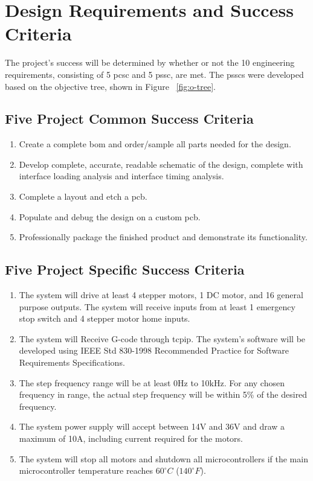 \chapter{Design Requirements and Success Criteria}
The project's success will be determined by whether or not the 10 engineering requirements, consisting of 5 \gls{pcsc} and 5 \gls{pssc}, are met.
The \gls{pssc}s were developed based on the objective tree, shown in Figure ~\ref{fig:o-tree}.

\section{Five Project Common Success Criteria}
\begin{enumerate}
	\item Create a complete \gls{bom} and order/sample all parts needed for the design.
	\item Develop complete, accurate, readable schematic of the design, complete with interface loading analysis and interface timing analysis. 
	\item Complete a layout and etch a \gls{pcb}.
	\item Populate and debug the design on a custom \gls{pcb}.
	\item Professionally package the finished product and demonstrate its functionality.
\end{enumerate}

\section{Five Project Specific Success Criteria}
\label{sec:psscs}
\begin{enumerate}
	\item The system will drive at least 4 stepper motors, 1 DC motor, and 16 general purpose outputs.
The system will receive inputs from at least 1 emergency stop switch and 4 stepper motor home inputs.
	\item The system will Receive G-code through \gls{tcpip}.
The system’s software will be developed using IEEE Std 830-1998 Recommended Practice for Software Requirements Specifications.
	\item The step frequency range will be at least 0Hz to 10kHz.
For any chosen frequency in range, the actual step frequency will be within 5\% of the desired frequency.
	\item The system power supply will accept between 14V and 36V and draw a maximum of 10A, including current required for the motors. 
	\item The system will stop all motors and shutdown all microcontrollers if the main microcontroller temperature reaches $60^{\circ}C$ ($140^{\circ}F$).
\end{enumerate}

